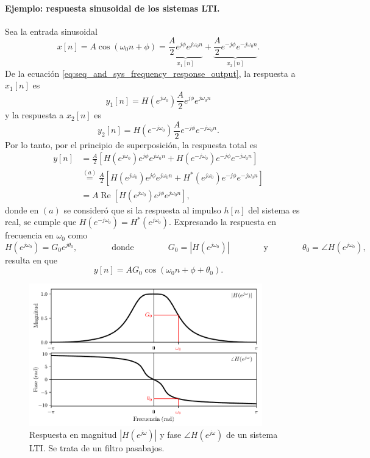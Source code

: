 \documentclass[a4paper]{report}
\renewcommand{\Re}{\operatorname{Re}}
\begin{document}
\paragraph{Ejemplo: respuesta sinusoidal de los sistemas LTI.} Sea la entrada sinusoidal
\[
 x[n]=A\cos(\omega_0n+\phi)=\underbrace{\frac{A}{2}e^{j\phi}e^{j\omega_0n}}_{\displaystyle x_1[n]}+\underbrace{\frac{A}{2}e^{-j\phi}e^{-j\omega_0n}}_{\displaystyle x_2[n]}.
\]
De la ecuación \ref{eq:seq_and_sys_frequency_response_output}, la respuesta a \(x_1[n]\) es
\[
 y_1[n]=H(e^{j\omega_0})\frac{A}{2}e^{j\phi}e^{j\omega_0n}
\]
y la respuesta a \(x_2[n]\) es
\[
 y_2[n]=H(e^{-j\omega_0})\frac{A}{2}e^{-j\phi}e^{-j\omega_0n}.
\]
Por lo tanto, por el principio de superposición, la respuesta total es
\begin{align*}
 y[n]&=\frac{A}{2}\left[H(e^{j\omega_0})e^{j\phi}e^{j\omega_0n}+H(e^{-j\omega_0})e^{-j\phi}e^{-j\omega_0n}\right]\\
  &\overset{(a)}{=}\frac{A}{2}\left[H(e^{j\omega_0})e^{j\phi}e^{j\omega_0n}+H^*(e^{j\omega_0})e^{-j\phi}e^{-j\omega_0n}\right]\\
  &=A\Re\left[H(e^{j\omega_0})e^{j\phi}e^{j\omega_0n}\right],
\end{align*}
donde en \((a)\) se consideró que si la respuesta al impulso \(h[n]\) del sistema es real, se cumple que \(H(e^{-j\omega_0})=H^*(e^{j\omega_0})\). Expresando la respuesta en frecuencia en \(\omega_0\) como
\[
 H(e^{j\omega_0})=G_0e^{j\theta_0},
 \qquad\qquad\textrm{donde}\qquad\qquad 
 G_0=|H(e^{j\omega_0})|
 \qquad\qquad\textrm{y}\qquad\qquad
 \theta_0=\angle H(e^{j\omega_0}),
\]
resulta en que 
\begin{equation}\label{eq:seq_and_sys_frequency_response_output_sinusoidal}
 y[n]=AG_0\cos(\omega_0n+\phi+\theta_0). 
\end{equation}
\begin{figure}[!htb]
 \begin{center}
 \includegraphics[width=0.90\textwidth]{figuras/seq_and_sys_frequency_response.pdf}
 \caption{\label{fig:seq_and_sys_frequency_response} Respuesta en magnitud \(|H(e^{j\omega})|\) y fase \(\angle H(e^{j\omega})\) de un sistema LTI. Se trata de un filtro pasabajos.}
 \end{center}
\end{figure}
\end{document}
